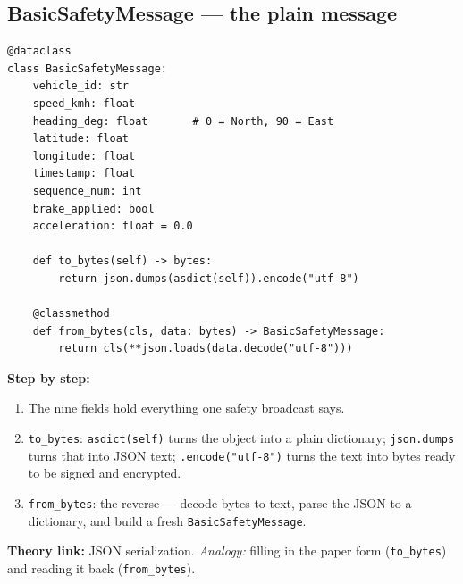 \documentclass[11pt,a4paper]{article}
\begin{document}
\subsection{BasicSafetyMessage --- the plain message}
\begin{lstlisting}[style=py,caption={v2v\_protocol.py --- the BasicSafetyMessage dataclass.}]
@dataclass
class BasicSafetyMessage:
    vehicle_id: str
    speed_kmh: float
    heading_deg: float       # 0 = North, 90 = East
    latitude: float
    longitude: float
    timestamp: float
    sequence_num: int
    brake_applied: bool
    acceleration: float = 0.0

    def to_bytes(self) -> bytes:
        return json.dumps(asdict(self)).encode("utf-8")

    @classmethod
    def from_bytes(cls, data: bytes) -> BasicSafetyMessage:
        return cls(**json.loads(data.decode("utf-8")))
\end{lstlisting}
\textbf{Step by step:}
\begin{enumerate}
  \item The nine fields hold everything one safety broadcast says.
  \item \texttt{to\_bytes}: \texttt{asdict(self)} turns the object into a plain
        dictionary; \texttt{json.dumps} turns that into JSON text;
        \texttt{.encode("utf-8")} turns the text into bytes ready to be signed
        and encrypted.
  \item \texttt{from\_bytes}: the reverse --- decode bytes to text, parse the
        JSON to a dictionary, and build a fresh \texttt{BasicSafetyMessage}.
\end{enumerate}
\textbf{Theory link:} JSON serialization. \emph{Analogy:} filling in the paper
form (\texttt{to\_bytes}) and reading it back (\texttt{from\_bytes}).
\end{document}
